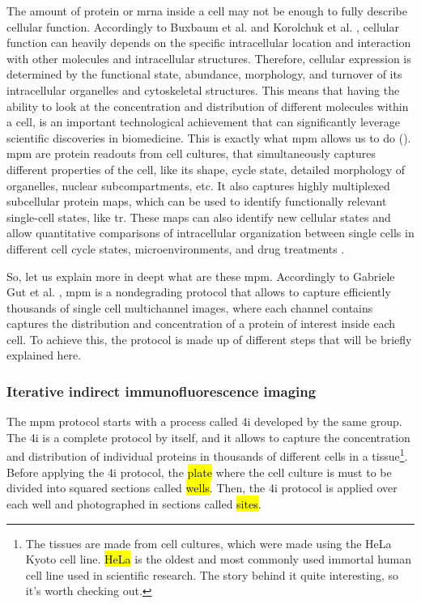 
\glsresetall

\graphicspath{{./Sections/Dataset/Resources/}}

The amount of protein or \gls{mrna} inside a cell may not be enough to fully describe cellular function. Accordingly to Buxbaum et al. \cite{Buxbaum_2014} and Korolchuk et al. \cite{Korolchuk2011}, cellular function can heavily depends on the specific intracellular location and interaction with other molecules and intracellular structures. Therefore, cellular expression is determined by the functional state, abundance, morphology, and turnover of its intracellular organelles and cytoskeletal structures. This means that having the ability to look at the concentration and distribution of different molecules within a cell, is an important technological achievement that can significantly leverage scientific discoveries in biomedicine.
This is exactly what \gls{mpm} allows us to do (\cite{Guteaar7042}). \gls{mpm} are protein readouts from cell cultures, that simultaneously captures different properties of the cell, like its shape, cycle state, detailed morphology of organelles, nuclear subcompartments, etc. It also captures highly multiplexed subcellular protein maps, which can be used to identify functionally relevant single-cell states, like \gls{tr}. These maps can also identify new cellular states and allow quantitative comparisons of intracellular organization between single cells in different cell cycle states, microenvironments, and drug treatments \cite{Guteaar7042}.

So, let us explain more in deept what are these \gls{mpm}. Accordingly to Gabriele Gut et al. \cite{Guteaar7042}, \gls{mpm} is a nondegrading protocol that allows to capture efficiently thousands of single cell multichannel images, where each channel contains captures the distribution and concentration of a protein of interest inside each cell. To achieve this, the protocol is made up of different steps that will be briefly explained here.

\subsubsection{Iterative indirect immunofluorescence imaging}
The \gls{mpm} protocol starts with a process called \gls{4i} developed by the same group. The \gls{4i} is a complete protocol by itself, and it allows to capture the concentration and distribution of individual proteins in thousands of different cells in a tissue\footnote{The tissues are made from cell cultures, which were made using the HeLa Kyoto cell line. \hl{HeLa} is the oldest and most commonly used immortal human cell line used in scientific research. The story behind it quite interesting, so it's worth checking out.}.
Before applying the \gls{4i} protocol, the \hl{plate} where the cell culture is must to be divided into squared sections called \hl{wells}. Then, the \gls{4i} protocol is applied over each well and photographed in sections called \hl{sites}.

